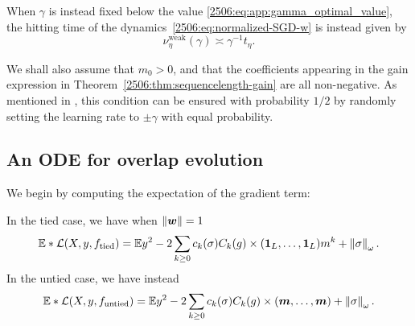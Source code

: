 \begin{remark}
    When $\gamma$ is instead fixed below the value \eqref{2506:eq:app:gamma_optimal_value}, the hitting time of the dynamics~\ref{2506:eq:normalized-SGD-w} is instead given by
    \[ \nu^\mathrm{weak}_\eta(\gamma) \asymp \gamma^{-1}t_\eta. \]
\end{remark}

We shall also assume that $m_0 > 0$, and that the coefficients appearing in the gain expression in Theorem~\ref{2506:thm:sequencelength-gain} are all non-negative. As mentioned in \cite{arous2021online,arnaboldi2024online,arnaboldi2024repetita}, this condition can be ensured with probability $1/2$ by randomly setting the learning rate to $\pm \gamma$ with equal probability.

\subsection{An ODE for overlap evolution}

We begin by computing the expectation of the gradient term:
\begin{lemma}\label{2506:lem:app:pop_loss}
    In the tied case, we have when $\left\lVert {\boldsymbol{w}}\right\rVert = 1$
    \[ \mathbb{E}*{\mathcal{L}(X, y, f_{\text{tied}})} = \mathbb{E}{y^2} -2\sum_{k \geq 0} c_k(\sigma) C_k(g) \times (\mathbf{1}_L, \dots, \mathbf{1}_L) m^k + \left\lVert \sigma\right\rVert_\omega. \]
    In the untied case, we have instead
    \[ \mathbb{E}*{\mathcal{L}(X, y, f_{\text{untied}})} = \mathbb{E}{y^2}-2\sum_{k \geq 0} c_k(\sigma) C_k(g) \times ({\boldsymbol{m}}, \dots, {\boldsymbol{m}}) + \left\lVert \sigma\right\rVert_\omega. \]
\end{lemma}


